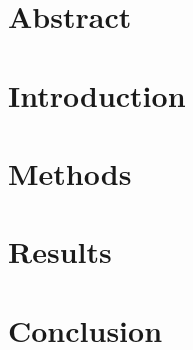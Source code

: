 \documentclass[12pt,twocolumn]{article}
\begin{document}

\onecolumn
\tableofcontents
\newpage

\twocolumn
\section{Abstract}


\section{Introduction}


\section{Methods}


\section{Results}


\section{Conclusion}


\onecolumn
\printbibliography
\end{document}
